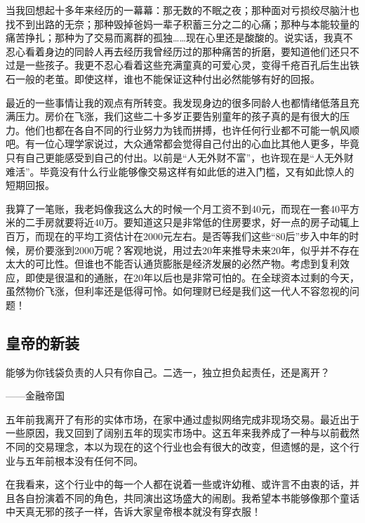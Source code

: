 当我回想起十多年来经历的一幕幕：那无数的不眠之夜；那种面对亏损绞尽脑汁也找不到出路的无奈；那种毁掉爸妈一辈子积蓄三分之二的心痛；那种与本能较量的痛苦挣扎；那种为了交易而离群的孤独……现在心里还是酸酸的。说实话，我真不忍心看着身边的同龄人再去经历我曾经历过的那种痛苦的折磨，要知道他们还只不过是一些孩子。我更不忍心看着这些充满童真的可爱心灵，变得千疮百孔后生出铁石一般的老茧。即使这样，谁也不能保证这种付出必然能够有好的回报。

最近的一些事情让我的观点有所转变。我发现身边的很多同龄人也都情绪低落且充满压力。房价在飞涨，我们这些二十多岁正要告别童年的孩子真的是有很大的压力。他们也都在各自不同的行业努力为钱而拼搏，也许任何行业都不可能一帆风顺吧。有一位心理学家说过，大众通常都会觉得自己付出的心血比其他人更多，毕竟只有自己更能感受到自己的付出。以前是“人无外财不富”，也许现在是“人无外财难活”。毕竟没有什么行业能够像交易这样有如此低的进入门槛，又有如此惊人的短期回报。

我算了一笔账，我老妈像我这么大的时候一个月工资不到40元，而现在一套40平方米的二手房就要将近40万。要知道这只是非常低的住房要求，好一点的房子动辄上百万，而现在的平均工资估计在2000元左右。是否等我们这些“80后”步入中年的时候，房价要涨到2000万呢？客观地说，用过去20年来推导未来20年，似乎并不存在太大的可比性。但谁也不能否认通货膨胀是经济发展的必然产物。考虑到复利效应，即使是很温和的通胀，在20年以后也是非常可怕的。在全球资本过剩的今天，虽然物价飞涨，但利率还是低得可怜。如何理财已经是我们这一代人不容忽视的问题！

\subsection{皇帝的新装}

{\kaishu
能够为你钱袋负责的人只有你自己。二选一，独立担负起责任，还是离开？

\hfill ——金融帝国
}

五年前我离开了有形的实体市场，在家中通过虚拟网络完成非现场交易。最近出于一些原因，我又回到了阔别五年的现实市场中。这五年来我养成了一种与以前截然不同的交易理念，本以为现在的这个行业也会有很大的改变，但遗憾的是，这个行业与五年前根本没有任何不同。

在我看来，这个行业中的每一个人都在说着一些或许幼稚、或许言不由衷的话，并且各自扮演着不同的角色，共同演出这场盛大的闹剧。我希望本书能够像那个童话中天真无邪的孩子一样，告诉大家皇帝根本就没有穿衣服！

